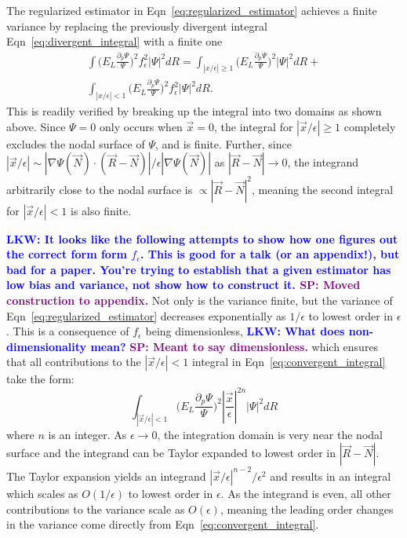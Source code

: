 \documentclass[twocolumn]{revtex4-1}
\newcommand{\lucas}[1]{\textbf{\textcolor{blue}{LKW: #1}}}
\newcommand{\shivesh}[1]{\textbf{\textcolor{purple}{SP: #1}}}
\begin{document}
The regularized estimator in Eqn~\ref{eq:regularized_estimator} achieves a finite variance by replacing the previously divergent integral Eqn~\ref{eq:divergent_integral} with a finite one
\begin{equation}
\begin{split}
\int \Big(E_L\frac{\partial_p\Psi}{\Psi}\Big)^2 f_\epsilon^2 |\Psi|^2 dR = \int_{|x/\epsilon|\geq 1} \Big(E_L\frac{\partial_p\Psi}{\Psi}\Big)^2 |\Psi|^2 dR +\\ \int_{|x/\epsilon|< 1} \Big(E_L\frac{\partial_p\Psi}{\Psi}\Big)^2 f_\epsilon^2 |\Psi|^2 dR.
\end{split}
\label{eq:convergent_integral}
\end{equation}
This is readily verified by breaking up the integral into two domains as shown above.
Since $\Psi = 0$ only occurs when $\vec{x} = 0$, the integral for $|\vec{x}/\epsilon|\geq 1$ completely excludes the nodal surface of $\Psi$, and is finite. 
Further, since $|\vec{x}/\epsilon| \sim |\nabla\Psi(\vec{N}) \cdot (\vec{R}-\vec{N})|/\epsilon|\nabla  \Psi(\vec{N})|$ as $|\vec{R} - \vec{N}| \rightarrow 0$, the integrand arbitrarily close to the nodal surface is $\propto |\vec{R} - \vec{N}|^2$, meaning the second integral for $|\vec{x}/\epsilon| < 1$ is also finite.

\lucas{It looks like the following attempts to show how one figures out the correct form form $f_\epsilon$. This is good for a talk (or an appendix!), but bad for a paper. You're trying to establish that a given estimator has low bias and variance, not show how to construct it. }
\shivesh{Moved construction to appendix.}
Not only is the variance finite, but the variance of Eqn~\ref{eq:regularized_estimator} decreases exponentially as $1/\epsilon$ to lowest order in $\epsilon$.
This is a consequence of $f_\epsilon$ being dimensionless, \lucas{What does non-dimensionality mean?} \shivesh{Meant to say dimensionless.} which ensures that all contributions to the $|\vec{x}/\epsilon|< 1$ integral in Eqn~\ref{eq:convergent_integral} take the form:
\begin{equation}
\int_{|\vec{x}/\epsilon|< 1} \Big(E_L\frac{\partial_p\Psi}{\Psi}\Big)^2 |\frac{\vec{x}}{\epsilon}|^{2n} |\Psi|^2 dR
\end{equation} 
where $n$ is an integer.
As $\epsilon \rightarrow 0$, the integration domain is very near the nodal surface and the integrand can be Taylor expanded to lowest order in $|\vec{R}-\vec{N}|$. 
The Taylor expansion yields an integrand $|\vec{x}/\epsilon|^{n-2}/\epsilon^2$ and results in an integral which scales as $O(1/\epsilon)$ to lowest order in $\epsilon$.
As the integrand is even, all other contributions to the variance scale as $O(\epsilon)$, meaning the leading order changes in the variance come directly from Eqn~\ref{eq:convergent_integral}.
\end{document}
